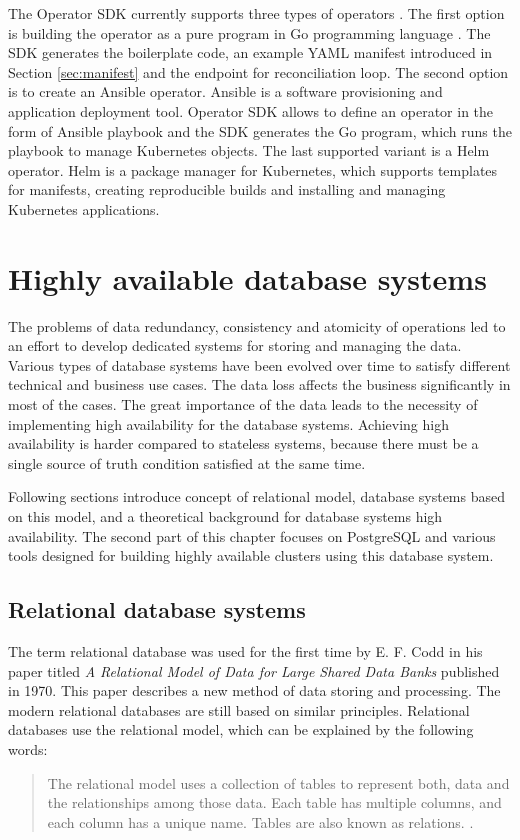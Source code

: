 \documentclass[
  digital, %
  twoside, %
  table,   %
  nolof,   %
  nolot,   %
]{fithesis3}
\begin{document}
The Operator SDK currently supports three types of operators \cite{operatorhub-sdk}. The first option is building the operator as a pure program in Go programming language \cite{golang}. The SDK generates the boilerplate code, an example YAML manifest introduced in Section \ref{sec:manifest} and the endpoint for reconciliation loop. The second option is to create an Ansible operator. Ansible \cite{ansible} is a software provisioning and application deployment tool. Operator SDK allows to define an operator in the form of Ansible playbook \cite{wwp} and the SDK generates the Go program, which runs the playbook to manage Kubernetes objects. The last supported variant is a Helm operator. Helm \cite{helm} is a package manager for Kubernetes, which supports templates for manifests, creating reproducible builds and installing and managing Kubernetes applications.


\chapter{Highly available database systems} \label{chap:ha_database_systems}
The problems of data redundancy, consistency and atomicity of operations led to an effort to develop dedicated systems for storing and managing the data. Various types of database systems have been evolved over time to satisfy different technical and business use cases. The data loss affects the business significantly in most of the cases. The great importance of the data leads to the necessity of implementing high availability for the database systems. Achieving high availability is harder compared to stateless systems, because there must be a single source of truth condition satisfied at the same time.

Following sections introduce concept of relational model, database systems based on this model, and a theoretical background for database systems high availability. The second part of this chapter focuses on PostgreSQL and various tools designed for building highly available clusters using this database system.

\section{Relational database systems}
The term relational database was used for the first time by E. F. Codd in his paper titled \textit{A Relational Model of Data for Large Shared Data Banks} \cite{codd_relational_model} published in 1970. This paper describes a new method of data storing and processing. The modern relational databases are still based on similar principles. Relational databases use the relational model, which can be explained by the following words:
\begin{quote}
The relational model uses a collection of tables to represent both, data and the relationships among those data. Each table has multiple columns, and each column has a unique name. Tables are also known as relations. \cite[p. 9]{db}.
\end{quote}
\end{document}
